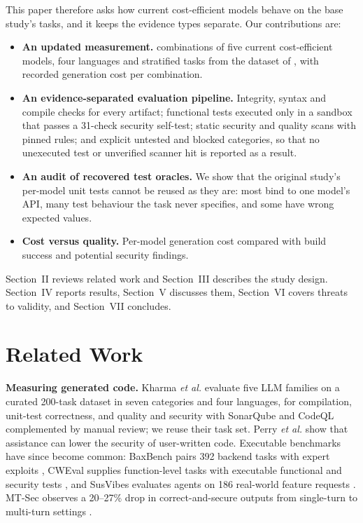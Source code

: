 \documentclass[conference]{IEEEtran}
\begin{document}
This paper therefore asks how current cost-efficient models behave on the base
study's tasks, and it keeps the evidence types separate. Our contributions are:
\begin{itemize}
\item \textbf{An updated measurement.} \nPlanned{} combinations of five current
cost-efficient models, four languages and \nTasks{} stratified tasks from the
dataset of \cite{kharma2026}, with recorded generation cost per combination.
\item \textbf{An evidence-separated evaluation pipeline.} Integrity, syntax and
compile checks for every artifact; functional tests executed only in a
sandbox that passes a 31-check security self-test; static security and quality
scans with pinned rules; and explicit untested and blocked categories, so that
no unexecuted test or unverified scanner hit is reported as a result.
\item \textbf{An audit of recovered test oracles.} We show that the original
study's per-model unit tests cannot be reused as they are: most bind to one
model's API, many test behaviour the task never specifies, and some have wrong
expected values.
\item \textbf{Cost versus quality.} Per-model generation cost compared with
build success and potential security findings.
\end{itemize}

Section~II reviews related work and Section~III describes the study design.
Section~IV reports results, Section~V discusses them, Section~VI covers threats
to validity, and Section~VII concludes.

\section{Related Work}

\textbf{Measuring generated code.} Kharma \textit{et al.} \cite{kharma2026}
evaluate five LLM families on a curated 200-task dataset in seven categories and
four languages, for compilation, unit-test correctness, and quality and
security with SonarQube and CodeQL complemented by manual review; we reuse
their task set. Perry \textit{et al.} \cite{perry2023} show that assistance can
lower the security of user-written code. Executable benchmarks have since
become common: BaxBench pairs 392 backend tasks with expert exploits
\cite{baxbench2025}, CWEval supplies function-level tasks with executable
functional and security tests \cite{cweval2025}, and SusVibes evaluates agents
on 186 real-world feature requests \cite{susvibes2026}. MT-Sec observes a
20--27\% drop in correct-and-secure outputs from single-turn to multi-turn
settings \cite{mtsec2025}.
\end{document}
